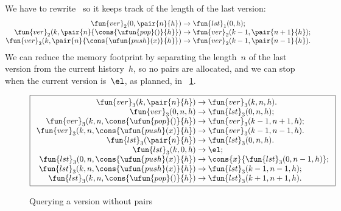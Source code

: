We have to rewrite~ so it keeps
track of the length of the last version:
\begin{equation*}
\begin{array}{@{}r@{\;}l@{\;}l@{}}
\fun{ver}_2(0,\pair{n}{h}) & \rightarrow & \fun{lst}_1(0,h);\\
\fun{ver}_2(k,\pair{n}{\cons{\ufun{pop}()}{h}})
                      & \rightarrow & \fun{ver}_2(k-1,\pair{n+1}{h});\\
\fun{ver}_2(k,\pair{n}{\cons{\ufun{push}(x)}{h}})
                      & \rightarrow & \fun{ver}_2(k-1,\pair{n-1}{h}).
\end{array}
\end{equation*}
We can reduce the memory footprint by separating the
length~\(n\) of the last version from the current history~\(h\), so no
pairs are allocated, and we can stop when the current version
is~\(\el\), as planned, in \fig~\ref{fig:ver_no_pair}.
\begin{figure}
\begin{equation*}
\boxed{%
\begin{array}{r@{\;}l@{\;}l}
\fun{ver}_3(k,\pair{n}{h}) & \rightarrow & \fun{ver}_3(k,n,h).\\
\fun{ver}_3(0,n,h) & \rightarrow & \fun{lst}_3(0,n,h);\\
\fun{ver}_3(k,n,\cons{\ufun{pop}()}{h})
                      & \rightarrow & \fun{ver}_3(k-1,n+1,h);\\
\fun{ver}_3(k,n,\cons{\ufun{push}(x)}{h})
                      & \rightarrow & \fun{ver}_3(k-1,n-1,h).\\
\fun{lst}_3(\pair{n}{h}) & \rightarrow & \fun{lst}_3(0,n,h).\\
\fun{lst}_3(k,0,h) & \rightarrow & \el;\\
\fun{lst}_3(0,n,\cons{\ufun{push}(x)}{h}) & \rightarrow
                      & \cons{x}{\fun{lst}_3(0,n-1,h)};\\
\fun{lst}_3(k,n,\cons{\ufun{push}(x)}{h}) & \rightarrow
                      & \fun{lst}_3(k-1,n-1,h);\\
\fun{lst}_3(k,n,\cons{\ufun{pop}()}{h}) & \rightarrow
                      & \fun{lst}_3(k+1,n+1,h).
\end{array}}
\end{equation*}
\caption{Querying a version without pairs}
\label{fig:ver_no_pair}
\end{figure}

